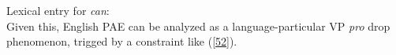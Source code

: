 \documentclass[output=paper
	        ,collection
	        ,collectionchapter
 	        ,biblatex
                ,babelshorthands
                ,newtxmath
                ,draftmode
                ,colorlinks, citecolor=brown
]{langscibook}
\begin{document}
{%
\ea
\label{51}
Lexical entry for \textit{can}:\\
\z
%
%
Given this, English PAE can be analyzed as a language-particular VP \textit{pro} drop phenomenon, trigged
by a constraint like (\ref{52}).



}
\end{document}
